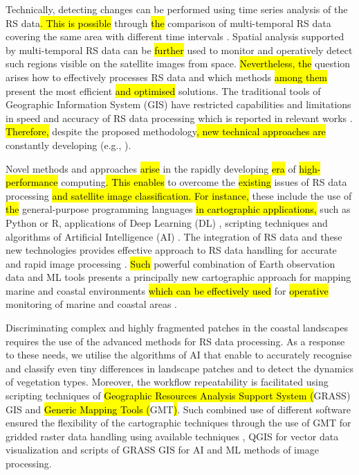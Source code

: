 \documentclass[jmse,article,submit,pdftex,moreauthors]{Definitions/mdpi}
\begin{document}
Technically, detecting changes can be performed using time series analysis of the RS data\hl{. This is possible }through \hl{the} comparison of multi-temporal RS data covering the same area with different time intervals \cite{GAO2024119622,Vasquez2023,MASRIA2024103502}. Spatial analysis supported by\hl{ }multi-temporal RS data can be \hl{further} used to monitor and operatively detect such regions visible on the satellite images from space. \hl{Nevertheless, the} question arises\hl{ }how to effectively processes RS data and which methods \hl{among them} present the most efficient \hl{and optimised} solutions. The traditional tools of Geographic Information System (GIS) have restricted capabilities and limitations in speed and accuracy of RS data processing which is reported in relevant works \cite{BLACKFORD1995247,Whig2024,Rolim2023}. \hl{Therefore, }despite the proposed methodology\hl{, new technical approaches are} constantly developing (e.g., \cite{BUGNOT2018939}). 

Novel methods and approaches \hl{arise} in the rapidly developing \hl{era} of \hl{high-performance} computing\hl{. This enables} to overcome the \hl{existing} issues of RS data processing\hl{ and satellite image classification. For instance,} these include\hl{ }the use of \hl{the }general-purpose programming languages \hl{in cartographic applications, }such as Python or R, applications of Deep Learning (DL) \cite{Park,Roselin}, scripting techniques \cite{Lemenkova202212,Lemenkova202213} and algorithms of Artificial Intelligence (AI) \cite{rs11060617,Lemenkova202211}. The integration of RS data and these new technologies provides effective approach to RS data handling for accurate and rapid image processing \cite{Turnbull,Lemenkova202323}. \hl{Such} powerful combination of Earth observation data and ML tools\hl{ }presents a principally new cartographic approach for mapping marine and coastal environments\hl{ which can be effectively used }for \hl{operative }monitoring of marine and coastal areas \cite{Cao2022}.

Discriminating complex and highly fragmented patches in the coastal landscapes requires the use of the advanced methods for RS data processing. As a response to these needs, we utilise the algorithms of AI that enable to accurately recognise and classify even tiny differences in landscape patches and to detect the dynamics of vegetation types. Moreover, the workflow repeatability is facilitated using scripting techniques of \hl{Geographic Resources Analysis Support System (}GRASS) GIS and \hl{Generic Mapping Tools (}GMT\hl{)}. Such combined use of different software ensured the flexibility of the cartographic techniques through the use of GMT for gridded raster data handling using available techniques \cite{Lemenkova202217}, QGIS for vector data visualization and scripts of GRASS GIS for AI and ML methods of image processing. 
\end{document}

